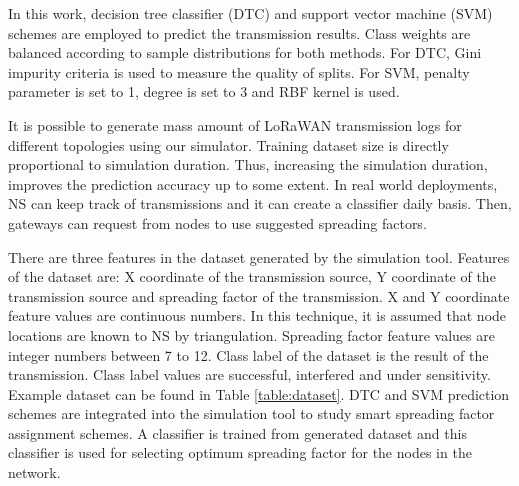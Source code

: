 In this work, decision tree classifier (DTC) and support vector machine (SVM) \cite{Alpaydin} schemes are employed to predict the transmission results. Class weights are balanced according to sample distributions for both methods. For DTC, Gini impurity criteria is used to measure the quality of splits. For SVM, penalty parameter is set to 1, degree is set to 3 and RBF kernel is used.

It is possible to generate mass amount of LoRaWAN transmission logs for different topologies using our simulator. Training dataset size is directly proportional to simulation duration. Thus, increasing the simulation duration, improves the prediction accuracy up to some extent. In real world deployments, NS can keep track of transmissions and it can create a classifier daily basis. Then, gateways can request from nodes to use suggested spreading factors.

There are three features in the dataset generated by the simulation tool. Features of the dataset are: X coordinate of the transmission source, Y coordinate of the transmission source and spreading factor of the transmission. X and Y coordinate feature values are continuous numbers. In this technique, it is assumed that node locations are known to NS by triangulation. Spreading factor feature values are integer numbers between 7 to 12. Class label of the dataset is the result of the transmission. Class label values are successful, interfered and under sensitivity. Example dataset can be found in Table \ref{table:dataset}. DTC and SVM prediction schemes are integrated into the simulation tool to study smart spreading factor assignment schemes. A classifier is trained from generated dataset and this classifier is used for selecting optimum spreading factor for the nodes in the network.

